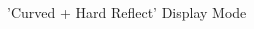 \clearpage
\begin{figure}[H]
    \centering
    \begin{adjustbox}{width=12cm,center}
    \end{adjustbox}
\caption{'Curved + Hard Reflect' Display Mode}
\end{figure}

